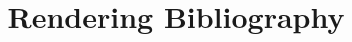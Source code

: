 \documentclass[acmtog,natbib=true,screen,review=false]{acmart}
\begin{document}
\title{Rendering Bibliography}

\maketitle


\renewcommand{\bibsection}{}

\nocite{*}


\end{document}
